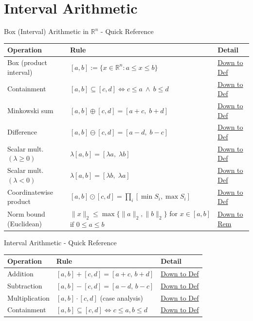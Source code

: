 \section{Interval Arithmetic}

\begin{toolkitbox}{Box (Interval) Arithmetic in $\mathbb{R}^n$ - Quick Reference}
\small
\begin{tabular}{l l l}
\toprule
\textbf{Operation} & \textbf{Rule} & \textbf{Detail} \\
\midrule
Box (product interval) & $[a,b] := \{x\in\mathbb{R}^n : a\le x \le b\}$ & \hyperref[def:box]{Down to Def} \\
Containment & $[a,b]\subseteq[c,d] \iff c\le a \ \land\ b\le d$ & \hyperref[def:box-contain]{Down to Def} \\
Minkowski sum & $[a,b]\oplus[c,d]=[a+c,\; b+d]$ & \hyperref[def:box-add]{Down to Def} \\
Difference & $[a,b]\ominus[c,d]=[a-d,\; b-c]$ & \hyperref[def:box-sub]{Down to Def} \\
Scalar mult. $(\lambda\ge 0)$ & $\lambda[a,b]=[\lambda a,\; \lambda b]$ & \hyperref[def:box-smul]{Down to Def} \\
Scalar mult. $(\lambda<0)$ & $\lambda[a,b]=[\lambda b,\; \lambda a]$ & \hyperref[def:box-smul]{Down to Def} \\
Coordinatewise product & $[a,b]\odot[c,d]=\prod_i [\min S_i,\max S_i]$ & \hyperref[def:box-hadamard]{Down to Def} \\
Norm bound (Euclidean) & $\|x\|_2 \le \max\{\|a\|_2,\|b\|_2\}$ for $x\in[a,b]$ if $0\le a\le b$ & \hyperref[rem:norm-bounds]{Down to Rem} \\
\bottomrule
\end{tabular}
\end{toolkitbox}

\begin{toolkitbox}{Interval Arithmetic - Quick Reference}
\small
\begin{tabular}{l l l}
\toprule
\textbf{Operation} & \textbf{Rule} & \textbf{Detail} \\
\midrule
Addition       & $[a,b] + [c,d] = [a+c,\, b+d]$           & \hyperref[def:interval-add]{Down to Def} \\
Subtraction    & $[a,b] - [c,d] = [a-d,\, b-c]$           & \hyperref[def:interval-sub]{Down to Def} \\
Multiplication & $[a,b] \cdot [c,d]$ (case analysis)      & \hyperref[def:interval-mult]{Down to Def} \\
Containment    & $[a,b] \subseteq [c,d] \iff c\leq a, b\leq d$ & \hyperref[def:interval-contain]{Down to Def} \\
\bottomrule
\end{tabular}
\end{toolkitbox}



